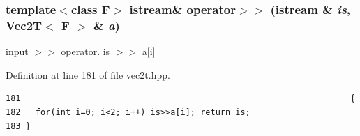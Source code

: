 \subsubsection{\setlength{\rightskip}{0pt plus 5cm}template$<$class F$>$ istream\& operator$>$$>$ (istream \& {\em is}, {\bf Vec2T}$<$ F $>$ \& {\em a})}\label{vec2t_8hpp_5ec56bcd785a044f33e56bc6893851a2_5ec56bcd785a044f33e56bc6893851a2}


input $>$$>$ operator. is $>$$>$ a[i] 

Definition at line 181 of file vec2t.hpp.

\footnotesize\begin{verbatim}181                                                                  {
182   for(int i=0; i<2; i++) is>>a[i]; return is;
183 }
\end{verbatim}\normalsize 


